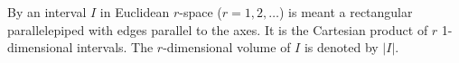 By an interval $I$ in Euclidean $r$-space ($r = 1, 2, \ldots$) is meant a rectangular parallelepiped with edges parallel to the axes. It is the Cartesian product of $r$ 1-dimensional intervals. The $r$-dimensional volume of $I$ is denoted by $|I|$.
